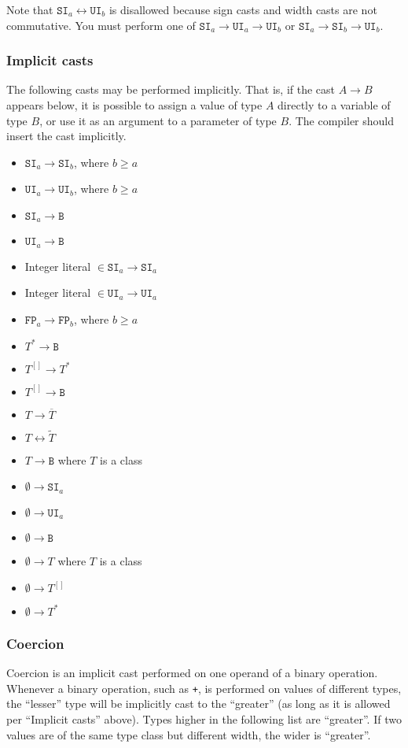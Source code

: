 \documentclass{article}
\newcommand{\R}[1]{\mathtt{#1}}
\newcommand{\both}{\leftrightarrow}
\begin{document}
Note that $\R{SI}_a \both \R{UI}_b$ is disallowed because sign casts and width
casts are not commutative. You must perform one of
$\R{SI}_a \to \R{UI}_a \to \R{UI}_b$ or $\R{SI}_a \to \R{SI}_b \to \R{UI}_b$.

\subsubsection{Implicit casts}
\label{ssb:types:casting:implicit}
The following casts may be performed implicitly. That is, if the cast
$A \to B$ appears below, it is possible to assign a value of type $A$ directly
to a variable of type $B$, or use it as an argument to a parameter of type
$B$. The compiler should insert the cast implicitly.

\begin{itemize}
\item{$\R{SI}_a \to \R{SI}_b$, where $b \geq a$}
\item{$\R{UI}_a \to \R{UI}_b$, where $b \geq a$}
\item{$\R{SI}_a \to \R{B}$}
\item{$\R{UI}_a \to \R{B}$}
\item{Integer literal $\in \R{SI}_a \to \R{SI}_a$}
\item{Integer literal $\in \R{UI}_a \to \R{UI}_a$}
\item{$\R{FP}_a \to \R{FP}_b$, where $b \geq a$}
\item{$T^* \to \R{B}$}
\item{$T^{[]} \to T^*$}
\item{$T^{[]} \to \R{B}$}
\item{$T \to \overline{T}$}
\item{$T \leftrightarrow \widetilde{T}$}
\item{$T \to \R{B}$ where $T$ is a class}
\item{$\emptyset \to \R{SI}_a$}
\item{$\emptyset \to \R{UI}_a$}
\item{$\emptyset \to \R{B}$}
\item{$\emptyset \to T$ where $T$ is a class}
\item{$\emptyset \to T^{[]}$}
\item{$\emptyset \to T^*$}
\end{itemize}

\subsubsection{Coercion}
\label{ssb:types:casting:coercion}
Coercion is an implicit cast performed on one operand of a binary operation.
Whenever a binary operation, such as \texttt{+}, is performed on values of
different types, the ``lesser'' type will be implicitly cast to the
``greater'' (as long as it is allowed per ``Implicit casts'' above).
Types higher in the following list are ``greater''. If two values are of the
same type class but different width, the wider is ``greater''.
\end{document}
